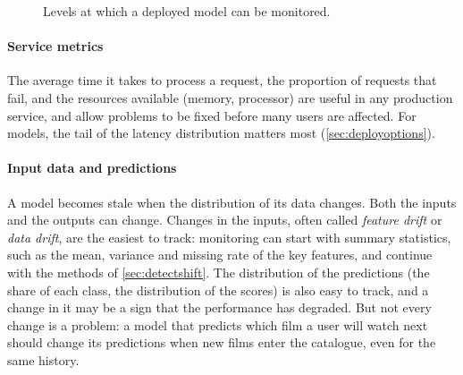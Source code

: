 \begin{figure}[htbp]
\centering
{}
\caption{Levels at which a deployed model can be monitored.}
\label{fig:monitorlayers}
\end{figure}

\paragraph{Service metrics} The average time it takes to process a request, the proportion of requests
that fail, and the resources available (memory, processor) are useful in any production service, and
allow problems to be fixed before many users are affected. For models, the tail of the latency
distribution matters most (\cref{sec:deployoptions}).

\paragraph{Input data and predictions} A model becomes stale when the distribution of its data changes.
Both the inputs and the outputs can change. Changes in the inputs, often called \emph{feature drift} or
\emph{data drift}, are the easiest to track: monitoring can start with summary statistics, such as the mean,
variance and missing rate of the key features, and continue with the methods of \cref{sec:detectshift}.
The distribution of the predictions (the share of each class, the distribution of the scores) is also
easy to track, and a change in it may be a sign that the performance has degraded. But not every change is
a problem: a model that predicts which film a user will watch next should change its predictions when new
films enter the catalogue, even for the same history.

